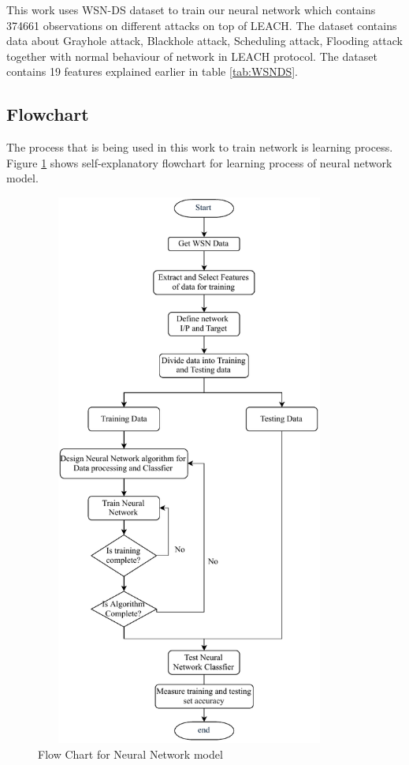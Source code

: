    \par This work uses WSN-DS dataset to train our neural network which contains 374661 observations on different attacks on top of LEACH. The dataset contains data about Grayhole attack, Blackhole attack, Scheduling attack, Flooding attack together with normal behaviour of network in LEACH protocol. The dataset contains 19 features explained earlier in table \ref{tab:WSNDS}.
    \subsection{Flowchart}
    The process that is being used in this work to train network is learning process. Figure \ref{FlowChart} shows self-explanatory flowchart for learning process of neural network model.
        \begin{figure}[hbp]
        \center	
        \includegraphics[width=4in, height=7.2in] {Figures/PDF/FlowChart.pdf}
        \caption{Flow Chart for Neural Network model}
        \label{FlowChart}	
        \end{figure}

